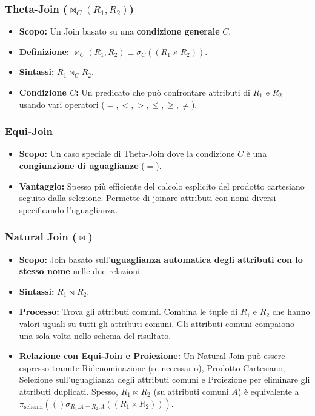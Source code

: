 \documentclass{article}
\newcommand{\selectop}[2]{\sigma_{#1}(#2)} %
\newcommand{\project}[2]{\pi_{#1}(#2)} %
\newcommand{\cartesian}{\times}
\newcommand{\naturaljoin}{\Join}
\newcommand{\thetajoin}[2]{\Join_{#1}(#2)} %
\begin{document}
	\subsubsection{Theta-Join ($\thetajoin{C}{R_1, R_2}$)}
	\begin{itemize}
		\item \textbf{Scopo:} Un Join basato su una \textbf{condizione generale} $C$.
		\item \textbf{Definizione:} $\thetajoin{C}{R_1, R_2} \equiv \selectop{C}{(R_1 \cartesian R_2)}$.
		\item \textbf{Sintassi:} $R_1 \naturaljoin_C R_2$.
		\item \textbf{Condizione $C$:} Un predicato che può confrontare attributi di $R_1$ e $R_2$ usando vari operatori ($=, <, >, \leq, \geq, \neq$).
	\end{itemize}
	
	\subsubsection{Equi-Join}
	\begin{itemize}
		\item \textbf{Scopo:} Un caso speciale di Theta-Join dove la condizione $C$ è una \textbf{congiunzione di uguaglianze} ($=$).
		\item \textbf{Vantaggio:} Spesso più efficiente del calcolo esplicito del prodotto cartesiano seguito dalla selezione. Permette di joinare attributi con nomi diversi specificando l'uguaglianza.
	\end{itemize}
	
	\subsubsection{Natural Join ($\naturaljoin$)}
	\begin{itemize}
		\item \textbf{Scopo:} Join basato sull'\textbf{uguaglianza automatica degli attributi con lo stesso nome} nelle due relazioni.
		\item \textbf{Sintassi:} $R_1 \naturaljoin R_2$.
		\item \textbf{Processo:} Trova gli attributi comuni. Combina le tuple di $R_1$ e $R_2$ che hanno valori uguali su tutti gli attributi comuni. Gli attributi comuni compaiono una sola volta nello schema del risultato.
		\item \textbf{Relazione con Equi-Join e Proiezione:} Un Natural Join può essere espresso tramite Ridenominazione (se necessario), Prodotto Cartesiano, Selezione sull'uguaglianza degli attributi comuni e Proiezione per eliminare gli attributi duplicati. Spesso, $R_1 \naturaljoin R_2$ (su attributi comuni $A$) è equivalente a $\project{\text{schema}}( \selectop{R_1.A = R_2.A}{(R_1 \cartesian R_2)})$.
	\end{itemize}
	
\end{document}
